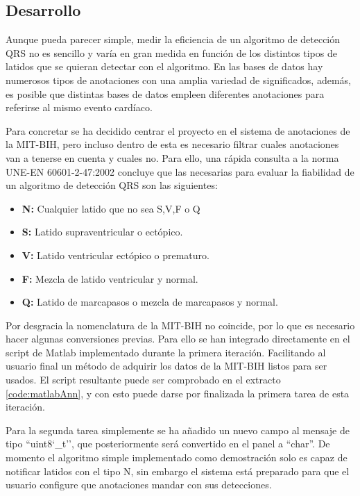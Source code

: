     \subsection{Desarrollo}
        Aunque pueda parecer simple, medir la eficiencia de un algoritmo de detección QRS no es sencillo y varía en gran medida en función de los distintos tipos de latidos que se quieran detectar con el algoritmo. En las bases de datos hay numerosos tipos de anotaciones con una amplia variedad de significados, además, es posible que distintas bases de datos empleen diferentes anotaciones para referirse al mismo evento cardíaco. 
     
        Para concretar se ha decidido centrar el proyecto en el sistema de anotaciones de la MIT-BIH, pero incluso dentro de esta es necesario filtrar cuales anotaciones van a tenerse en cuenta y cuales no. Para ello, una rápida consulta a la norma UNE-EN 60601-2-47:2002 concluye que las necesarias para evaluar la fiabilidad de un algoritmo de detección QRS son las siguientes:
        
        \begin{itemize}
            \item \textbf{N:} Cualquier latido que no sea S,V,F o Q
            \item \textbf{S:} Latido supraventricular o ectópico.
            \item \textbf{V:} Latido ventricular ectópico o prematuro.
            \item \textbf{F:} Mezcla de latido ventricular y normal.
            \item \textbf{Q:} Latido de marcapasos o mezcla de marcapasos y normal.
        \end{itemize}
        
        
        Por desgracia la nomenclatura de la MIT-BIH no coincide, por lo que es necesario hacer algunas conversiones previas. Para ello se han integrado directamente en el script de Matlab implementado durante la primera iteración. Facilitando al usuario final un método de adquirir los datos de la MIT-BIH listos para ser usados. El script resultante puede ser comprobado en el extracto \ref{code:matlabAnn}, y con esto puede darse por finalizada la primera tarea de esta iteración.
        
        
        Para la segunda tarea simplemente se ha añadido un nuevo campo al mensaje de tipo ``uint8\char`_t'', que posteriormente será convertido en el panel a ``char''. De momento el algoritmo simple implementado como demostración solo es capaz de notificar latidos con el tipo N, sin embargo el sistema está preparado para que el usuario configure que anotaciones mandar con sus detecciones.
        
